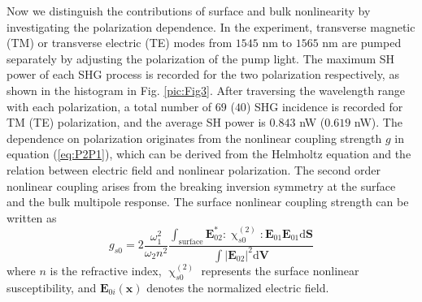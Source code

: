 \documentclass[a4paper,8pt,hyperref, twocolumn]{article}
\begin{document}




Now we distinguish the contributions of surface and bulk nonlinearity by investigating the polarization dependence.
In the experiment, transverse magnetic (TM) or transverse electric (TE) modes from $1545$ nm to $1565$ nm are pumped separately by adjusting the polarization of the pump light. 
The maximum SH power of each SHG process is recorded for the two polarization respectively, as shown in the histogram in Fig. \ref{pic:Fig3}. 
After traversing the wavelength range with each polarization, a total number of $69$ ($40$) SHG incidence is recorded for TM (TE) polarization, and the average SH power is $0.843$ nW ($0.619$ nW). 
The dependence on polarization originates from the %
nonlinear coupling strength $g$ in equation (\ref{eq:P2P1}), which can be derived from the Helmholtz equation and the relation between electric field and nonlinear polarization. %
The second order nonlinear coupling arises from the breaking inversion symmetry at the surface and the bulk multipole response. The surface nonlinear coupling strength can be written as
\begin{equation}
g_{s0} = 2\frac{\omega_1^2}{\omega_2n^2}\frac{\int_{\mathrm{surface} } \mathbf{E}_{02}^*:\upchi^{(2)}_{s0}:\mathbf{E}_{01}\mathbf{E}_{01} \mathrm{d}	\mathbf{S}}{\int |\mathbf{E}_{02}|^2 \mathrm{d}	\mathbf{V}}
\end{equation}
where $n$ is the refractive index, $\upchi^{(2)}_{s0}$ represents the surface nonlinear susceptibility, and $\mathbf{E}_{0i}(\mathbf{x})$ denotes the  normalized electric field. %
\end{document}

